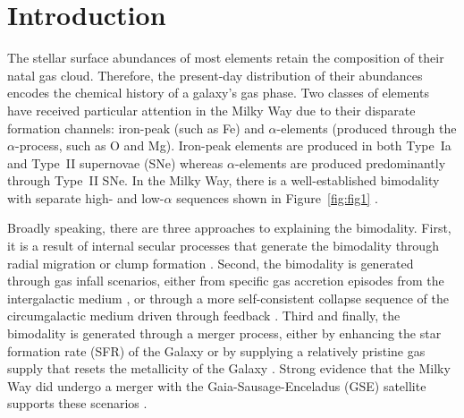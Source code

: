 \documentclass[twocolumn]{aastex631}
\begin{document}
\section{Introduction}\label{sec:intro}
The stellar surface abundances of most elements retain the composition of their natal gas cloud. Therefore, the present-day distribution of their abundances encodes the chemical history of a galaxy's gas phase. Two classes of elements have received particular attention in the Milky Way due to their disparate formation channels: iron-peak (such as Fe) and $\alpha$-elements (produced through the $\alpha$-process, such as O and Mg). Iron-peak elements are produced in both Type~Ia and Type~II supernovae (SNe) whereas $\alpha$-elements are produced predominantly through Type~II SNe. In the Milky Way, there is a well-established bimodality with separate high- and low-$\alpha$ sequences shown in Figure~\ref{fig:fig1} \citep{1996ASPC...92..307G,1998A&A...338..161F,2004AN....325....3F,2006MNRAS.367.1329R,2011A&A...535L..11A,2012A&A...545A..32A,2014A&A...562A..71B,2014ApJ...796...38N,2020MNRAS.493.2952H}.

Broadly speaking, there are three approaches to explaining the bimodality. First, it is a result of internal secular processes that generate the bimodality through radial migration \citep{2009MNRAS.396..203S,2021MNRAS.507.5882S,2023MNRAS.523.3791C} or clump formation \citep{2019MNRAS.484.3476C,2020MNRAS.492.4716B,2021MNRAS.502..260B,2023ApJ...953..128G}. Second, the bimodality is generated through gas infall scenarios, either from specific gas accretion episodes from the intergalactic medium \citep{1997ApJ...477..765C,2009IAUS..254..191C,2017MNRAS.472.3637G,2019A&A...623A..60S}, or through a more self-consistent collapse sequence of the circumgalactic medium driven through feedback \citep{2021MNRAS.501.5176K}. Third and finally, the bimodality is generated through a merger process, either by enhancing the star formation rate (SFR) of the Galaxy \citep{2004ApJ...612..894B,2005ApJ...630..298B,2007ApJ...658...60B,2010MNRAS.402.1489R} or by supplying a relatively pristine gas supply that resets the metallicity of the Galaxy \citep{2020MNRAS.491.5435B,2024MNRAS.528L.122C}. Strong evidence that the Milky Way did undergo a merger with the Gaia-Sausage-Enceladus (GSE) satellite supports these scenarios \citep{2018MNRAS.478..611B,2018Natur.563...85H,2020ApJ...901...48N,2024ApJ...972..112C}.
\end{document}
